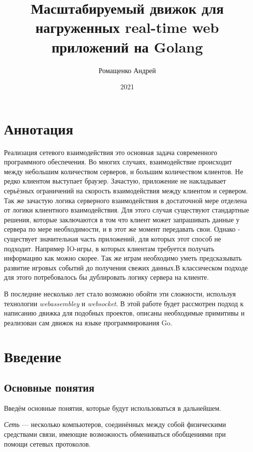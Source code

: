 \documentclass[a4paper,14pt, openany]{book}
\title{Масштабируемый движок для нагруженных real-time web приложений на Golang}
\author{Ромащенко Андрей}
\date{2021}
\begin{document}
\maketitle

\chapter*{Аннотация}

Реализация сетевого взаимодействия это основная задача современного программного обеспечения. Во многих случаях, взаимодействие происходит между небольшим количеством серверов, и большим количеством клиентов. Не редко клиентом выступает браузер. Зачастую, приложение не накладывает серьёзных ограничений на скорость взаимодействия между клиентом и сервером. Так же зачастую логика серверного взаимодействия в достаточной мере отделена от логики клиентного взаимодействия. Для этого случая существуют стандартные решения, которые заключаются в том что клиент может запрашивать данные у сервера по мере необходимости, и в этот же момент передавать свои. Однако - существует значительная часть приложений, для которых этот способ не подходит. Например IO-игры, в которых клиентам требуется получать информацию как можно скорее. Так же играм необходимо уметь предсказывать развитие игровых событий до получения свежих данных.В классическом подходе для этого потребовалось бы дублировать логику сервера на клиенте.

В последние несколько лет стало возможно обойти эти сложности, используя технологии \textit{webassembley}  и \textit{websocket}. В этой работе будет рассмотрен подход к написанию движка для подобных проектов, описаны необходимые примитивы и реализован сам движок на языке программирования Go.
\par
\setcounter{page}{1}
\tableofcontents
\clearpage



\chapter{Введение}

\section{Основные понятия}

Введём основные понятия, которые будут использоваться в дальнейшем.

\emph{Сеть} --- несколько компьютеров, соединённых между собой физическими средствами связи, имеющие возможность обмениваться обобщениями при помощи сетевых протоколов.
\end{document}
